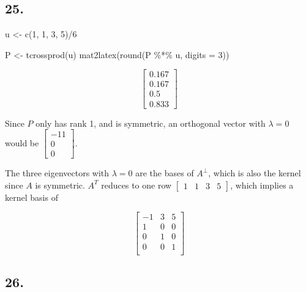 \documentclass[
]{article}
\newenvironment{Shaded}{\begin{snugshade}}{\end{snugshade}}
\newcommand{\AttributeTok}[1]{\textcolor[rgb]{0.00,0.34,0.68}{#1}}
\newcommand{\DecValTok}[1]{\textcolor[rgb]{0.69,0.50,0.00}{#1}}
\newcommand{\FunctionTok}[1]{\textcolor[rgb]{0.39,0.29,0.61}{#1}}
\newcommand{\NormalTok}[1]{\textcolor[rgb]{0.12,0.11,0.11}{#1}}
\newcommand{\OtherTok}[1]{\textcolor[rgb]{0.00,0.43,0.16}{#1}}
\newcommand{\SpecialCharTok}[1]{\textcolor[rgb]{0.24,0.68,0.91}{#1}}
\begin{document}
\hypertarget{section-22}{%
\subsection{25.}\label{section-22}}

\begin{Shaded}
\begin{Highlighting}[]
\NormalTok{u }\OtherTok{\textless{}{-}} \FunctionTok{c}\NormalTok{(}\DecValTok{1}\NormalTok{, }\DecValTok{1}\NormalTok{, }\DecValTok{3}\NormalTok{, }\DecValTok{5}\NormalTok{)}\SpecialCharTok{/}\DecValTok{6}

\NormalTok{P }\OtherTok{\textless{}{-}} \FunctionTok{tcrossprod}\NormalTok{(u)}
\FunctionTok{mat2latex}\NormalTok{(}\FunctionTok{round}\NormalTok{(P }\SpecialCharTok{\%*\%}\NormalTok{ u, }\AttributeTok{digits =} \DecValTok{3}\NormalTok{))}
\end{Highlighting}
\end{Shaded}

\[
\begin{bmatrix}
0.167\\
0.167\\
0.5\\
0.833
\end{bmatrix}
\]

Since \(P\) only has rank 1, and is symmetric, an orthogonal vector with
\(\lambda = 0\) would be \(\begin{bmatrix}-1 1\\0\\0\end{bmatrix}\).

The three eigenvectors with \(\lambda = 0\) are the bases of
\(A^{\perp}\), which is also the kernel since \(A\) is symmetric.
\(A^T\) reduces to one row \(\begin{bmatrix}1 & 1 & 3 &5\end{bmatrix}\),
which implies a kernel basis of

\[ \begin{bmatrix}
  -1 & 3 & 5\\
  1 & 0 & 0\\
  0 & 1 & 0\\
  0 & 0 & 1\\
\end{bmatrix}\]

\hypertarget{section-23}{%
\subsection{26.}\label{section-23}}
\end{document}
